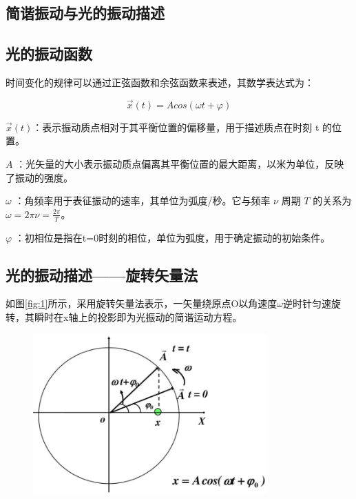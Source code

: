 \documentclass[withoutpreface,bwprint]{cumcmthesis} %
\begin{document}
\newpage
\begin{appendices}
    \section{简谐振动与光的振动描述}
    \label{app:optical_basis}

    \subsection{光的振动函数}
    时间变化的规律可以通过正弦函数和余弦函数来表述，其数学表达式为：

    \[\overrightarrow{x}(t) = Acos(\omega t + \varphi)\]

    \(\overrightarrow{x}(t)\)：表示振动质点相对于其平衡位置的偏移量，用于描述质点在时刻 t 的位置。

    \(A\) ：光矢量的大小表示振动质点偏离其平衡位置的最大距离，以米为单位，反映了振动的强度。

    \(\omega\) ：角频率用于表征振动的速率，其单位为弧度/秒。它与频率 \(\nu\) 周期 \(T\) 的关系为 \(\omega = 2\pi\nu = \frac{2\pi}{T}\)。

    \(\varphi\) ：初相位是指在t=0时刻的相位，单位为弧度，用于确定振动的初始条件。

    \subsection{光的振动描述——旋转矢量法}
    如图\ref{fig:1}所示，采用旋转矢量法表示，一矢量绕原点O以角速度$\omega$逆时针匀速旋转，其瞬时在x轴上的投影即为光振动的简谐运动方程。

    \begin{figure}[!h]
        \centering
        \includegraphics[width=0.8\textwidth]{figures/figure1.png} %


\end{figure}
\end{appendices}
\end{document}
